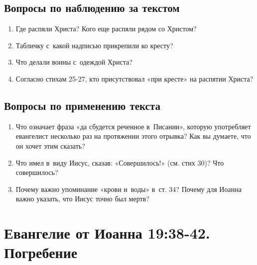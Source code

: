\documentclass[a4paper,12pt]{article}
\begin{document}
\subsection*{Вопросы по наблюдению за текстом}
\begin{enumerate}
    \item Где распяли Христа? Кого еще распяли рядом со Христом? 
    
    \myline
    
    \myline
    \item Табличку с~какой надписью прикрепили ко кресту? 
    
    \myline
    
    \myline
    \item Что делали воины с~одеждой Христа? 
    
    \myline
    
    \myline
    \item Согласно стихам 25-27, кто присутствовал «при кресте» на распятии Христа? 
    
    \myline
    
    \myline
\end{enumerate}

\subsection*{Вопросы по применению текста} 
\begin{enumerate}
    \item Что означает фраза «да сбудется реченное в~Писании», которую употребляет евангелист несколько раз на протяжении этого отрывка? Как вы думаете, что он хочет этим сказать? 
    
    \myline
    
    \myline
    \item Что имел в~виду Иисус, сказав: «Совершилось!» (см. стих 30)? Что совершилось?
    
    \myline
    
    \myline
    \item Почему важно упоминание «крови и~воды» в~ст. 34? Почему для Иоанна важно указать, что Иисус точно был мертв? 
    
    \myline
    
    \myline
\end{enumerate}



\section{Евангелие от Иоанна 19:38-42. Погребение}
\end{document}
